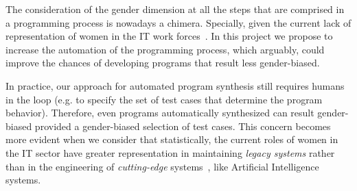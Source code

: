 \documentclass[10pt,a4paper]{paper}
\begin{document}
The consideration of the gender dimension at all the steps that are comprised in a programming process is nowadays a chimera. Specially, given the current lack of representation of women in the IT work forces~\cite{arnold2001global}.  In this project we propose to increase the automation of the programming process, which arguably, could improve the chances of developing programs that result less gender-biased.

In practice, our approach for automated program synthesis still requires humans in the loop (e.g. to specify the set of test cases that determine the program behavior). Therefore, even programs automatically synthesized can result gender-biased provided a gender-biased selection of test cases. This concern becomes more evident when we consider that statistically, the current roles of women in the IT sector have greater representation in maintaining {\em legacy systems} rather than in the engineering of {\em cutting-edge} systems~\cite{Dattero:2004:PLG:962081.962087}, like Artificial Intelligence systems.

\vspace{0.3cm}


\begin{scriptsize}

\end{scriptsize}

\end{document}
